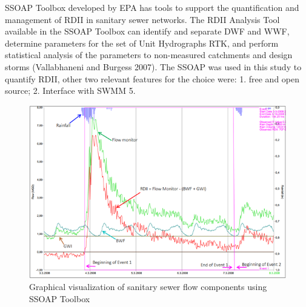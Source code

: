 SSOAP Toolbox developed by \ac{EPA} has tools to support the quantification and management of RDII in sanitary sewer networks. The RDII Analysis Tool available in the SSOAP Toolbox can identify and separate DWF and WWF, determine parameters for the set of Unit Hydrographs RTK, and perform statistical analysis of the parameters to non-measured catchments and design storms (Vallabhaneni and Burgess 2007). The SSOAP was used in this study to quantify RDII, other two relevant features for the choice were: 1. free and open source; 2. Interface with SWMM 5.


\begin{figure}[h]
    \centering
	\includegraphics[scale=1.2]{figures/SSOAP_example.png}
	\caption{Graphical visualization of sanitary sewer flow components using SSOAP Toolbox}
	\label{fig:SSOAPexample}
\end{figure}
